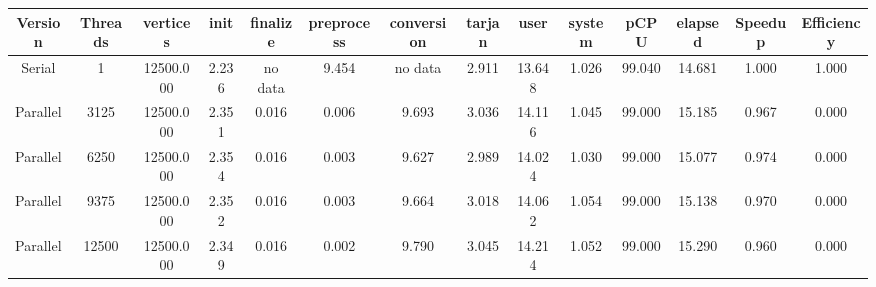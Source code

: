 \begin{tabular}{|c|c|c|c|c|c|c|c|c|c|c|c|c|c|}
\toprule
 Version &  Threads &  vertices &  init & finalize &  preprocess & conversion &  tarjan &   user &  system &   pCPU &  elapsed &  Speedup &  Efficiency \\
\midrule
  Serial &        1 & 12500.000 & 2.236 &  no data &       9.454 &    no data &   2.911 & 13.648 &   1.026 & 99.040 &   14.681 &    1.000 &       1.000 \\
Parallel &     3125 & 12500.000 & 2.351 &    0.016 &       0.006 &      9.693 &   3.036 & 14.116 &   1.045 & 99.000 &   15.185 &    0.967 &       0.000 \\
Parallel &     6250 & 12500.000 & 2.354 &    0.016 &       0.003 &      9.627 &   2.989 & 14.024 &   1.030 & 99.000 &   15.077 &    0.974 &       0.000 \\
Parallel &     9375 & 12500.000 & 2.352 &    0.016 &       0.003 &      9.664 &   3.018 & 14.062 &   1.054 & 99.000 &   15.138 &    0.970 &       0.000 \\
Parallel &    12500 & 12500.000 & 2.349 &    0.016 &       0.002 &      9.790 &   3.045 & 14.214 &   1.052 & 99.000 &   15.290 &    0.960 &       0.000 \\
\bottomrule
\end{tabular}
